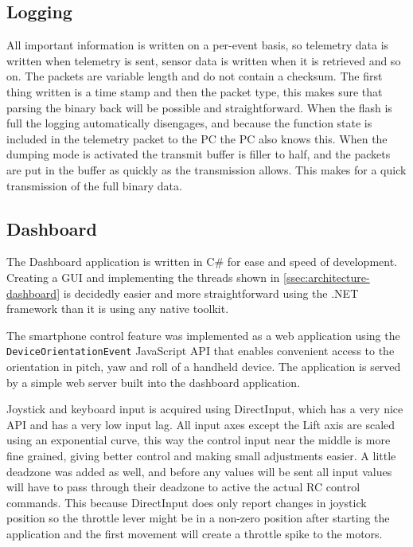 \documentclass[final]{article}
\begin{document}
\subsection{Logging}
All important information is written on a per-event basis, so telemetry data is written when telemetry is sent, sensor data is written when it is retrieved and so on.
The packets are variable length and do not contain a checksum.
The first thing written is a time stamp and then the packet type, this makes sure that parsing the binary back will be possible and straightforward.
When the flash is full the logging automatically disengages, and because the function state is included in the telemetry packet to the PC the PC also knows this.
When the dumping mode is activated the transmit buffer is filler to half, and the packets are put in the buffer as quickly as the transmission allows.
This makes for a quick transmission of the full binary data.

\subsection{Dashboard}
The Dashboard application is written in C\# for ease and speed of development.
Creating a GUI and implementing the threads shown in \cref{ssec:architecture-dashboard} is decidedly easier and more straightforward using the .NET framework than it is using any native toolkit.

The smartphone control feature was implemented as a web application using the \texttt{DeviceOrientationEvent} JavaScript API that enables convenient access to the orientation in pitch, yaw and roll of a handheld device.
The application is served by a simple web server built into the dashboard application.

Joystick and keyboard input is acquired using DirectInput, which has a very nice API and has a very low input lag.
All input axes except the Lift axis are scaled using an exponential curve, this way the control input near the middle is more fine grained, giving better control and making small adjustments easier.
A little deadzone was added as well, and before any values will be sent all input values will have to pass through their deadzone to active the actual RC control commands.
This because DirectInput does only report changes in joystick position so the throttle lever might be in a non-zero position after starting the application and the first movement will create a throttle spike to the motors.
\end{document}
